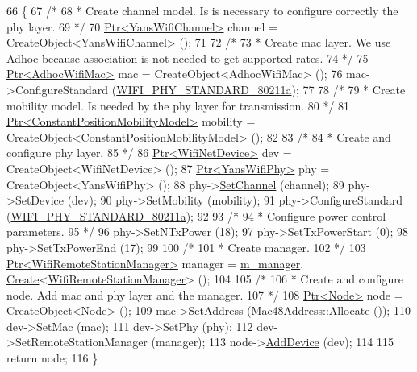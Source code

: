 \begin{DoxyCode}
66 \{
67   \textcolor{comment}{/*}
68 \textcolor{comment}{   * Create channel model. Is is necessary to configure correctly the phy layer.}
69 \textcolor{comment}{   */}
70   \hyperlink{classns3_1_1Ptr}{Ptr<YansWifiChannel>} channel = CreateObject<YansWifiChannel> ();
71 
72   \textcolor{comment}{/*}
73 \textcolor{comment}{   * Create mac layer. We use Adhoc because association is not needed to get supported rates.}
74 \textcolor{comment}{   */}
75   \hyperlink{classns3_1_1Ptr}{Ptr<AdhocWifiMac>} mac = CreateObject<AdhocWifiMac> ();
76   mac->ConfigureStandard (\hyperlink{group__wifi_gga1299834f4e1c615af3ca738033b76a49a22db1e8022db2c3450414b86c77b11e4}{WIFI\_PHY\_STANDARD\_80211a});
77 
78   \textcolor{comment}{/*}
79 \textcolor{comment}{   * Create mobility model. Is needed by the phy layer for transmission.}
80 \textcolor{comment}{   */}
81   \hyperlink{classns3_1_1Ptr}{Ptr<ConstantPositionMobilityModel>} mobility = 
      CreateObject<ConstantPositionMobilityModel> ();
82 
83   \textcolor{comment}{/*}
84 \textcolor{comment}{   * Create and configure phy layer.}
85 \textcolor{comment}{   */}
86   \hyperlink{classns3_1_1Ptr}{Ptr<WifiNetDevice>} dev = CreateObject<WifiNetDevice> ();
87   \hyperlink{classns3_1_1Ptr}{Ptr<YansWifiPhy>} phy = CreateObject<YansWifiPhy> ();
88   phy->\hyperlink{classns3_1_1YansWifiPhy_ad2eeb0ab17ef01b26436f7110cccff1d}{SetChannel} (channel);
89   phy->SetDevice (dev);
90   phy->SetMobility (mobility);
91   phy->ConfigureStandard (\hyperlink{group__wifi_gga1299834f4e1c615af3ca738033b76a49a22db1e8022db2c3450414b86c77b11e4}{WIFI\_PHY\_STANDARD\_80211a});
92 
93   \textcolor{comment}{/*}
94 \textcolor{comment}{   * Configure power control parameters.}
95 \textcolor{comment}{   */}
96   phy->SetNTxPower (18);
97   phy->SetTxPowerStart (0);
98   phy->SetTxPowerEnd (17);
99 
100   \textcolor{comment}{/*}
101 \textcolor{comment}{   * Create manager.}
102 \textcolor{comment}{   */}
103   \hyperlink{classns3_1_1Ptr}{Ptr<WifiRemoteStationManager>} manager = \hyperlink{classPowerRateAdaptationTest_afa9f7fb131c12b88efa24138930c50b3}{m\_manager}.
      \hyperlink{classns3_1_1ObjectFactory_a18152e93f0a6fe184ed7300cb31e9896}{Create}<\hyperlink{classns3_1_1WifiRemoteStationManager}{WifiRemoteStationManager}> ();
104 
105   \textcolor{comment}{/*}
106 \textcolor{comment}{   * Create and configure node. Add mac and phy layer and the manager.}
107 \textcolor{comment}{   */}
108   \hyperlink{classns3_1_1Ptr}{Ptr<Node>} node = CreateObject<Node> ();
109   mac->SetAddress (Mac48Address::Allocate ());
110   dev->SetMac (mac);
111   dev->SetPhy (phy);
112   dev->SetRemoteStationManager (manager);
113   node->\hyperlink{classns3_1_1Node_a42ff83ee1d5d1649c770d3f5b62375de}{AddDevice} (dev);
114 
115   \textcolor{keywordflow}{return} node;
116 \}
\end{DoxyCode}


